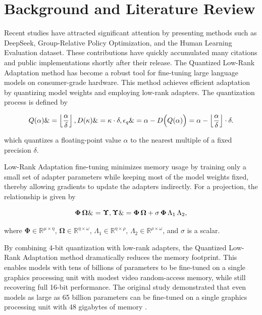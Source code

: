 \documentclass{svproc}
\begin{document}
\section{Background and Literature Review}

Recent studies have attracted significant attention by presenting methods such as DeepSeek, Group-Relative Policy Optimization, and the Human Learning Evaluation dataset. These contributions have quickly accumulated many citations and public implementations shortly after their release. The Quantized Low-Rank Adaptation method has become a robust tool for fine-tuning large language models on consumer-grade hardware. This method achieves efficient adaptation by quantizing model weights and employing low-rank adapters. The quantization process is defined by


\begin{equation}
  Q(\alpha) \&= \left\lfloor \frac{\alpha}{\delta} \right\rfloor,\\
  D(\kappa) \&= \kappa \cdot \delta, \\
  \epsilon_{q} \&= \alpha - D\Bigl(Q(\alpha)\Bigr) = \alpha - \left\lfloor \frac{\alpha}{\delta} \right\rfloor \cdot \delta.
\end{equation}

\noindent
which quantizes a floating-point value \(\alpha\) to the nearest multiple of a fixed precision \(\delta\).

Low-Rank Adaptation fine-tuning minimizes memory usage by training only a small set of adapter parameters while keeping most of the model weights fixed, thereby allowing gradients to update the adapters indirectly. For a projection, the relationship is given by


\begin{equation}
  \boldsymbol{\Phi}\,\boldsymbol{\Omega} \&= \boldsymbol{\Upsilon}, \\
  \boldsymbol{\Upsilon} \&= \boldsymbol{\Phi}\,\boldsymbol{\Omega} + \sigma\,\boldsymbol{\Phi}\,\Lambda_1\,\Lambda_2,
\end{equation}

\noindent
where \(\boldsymbol{\Phi} \in \mathbb{R}^{\mu \times \eta}\), \(\boldsymbol{\Omega} \in \mathbb{R}^{\eta \times \omega}\), \(\Lambda_1 \in \mathbb{R}^{\eta \times \rho}\), \(\Lambda_2 \in \mathbb{R}^{\rho \times \omega}\), and \(\sigma\) is a scalar.

By combining 4-bit quantization with low-rank adapters, the Quantized Low-Rank Adaptation method dramatically reduces the memory footprint. This enables models with tens of billions of parameters to be fine-tuned on a single graphics processing unit with modest video random-access memory, while still recovering full 16-bit performance. The original study demonstrated that even models as large as 65 billion parameters can be fine-tuned on a single graphics processing unit with 48 gigabytes of memory \cite{dettmers2023qloraefficientfinetuningquantized}.
\end{document}
